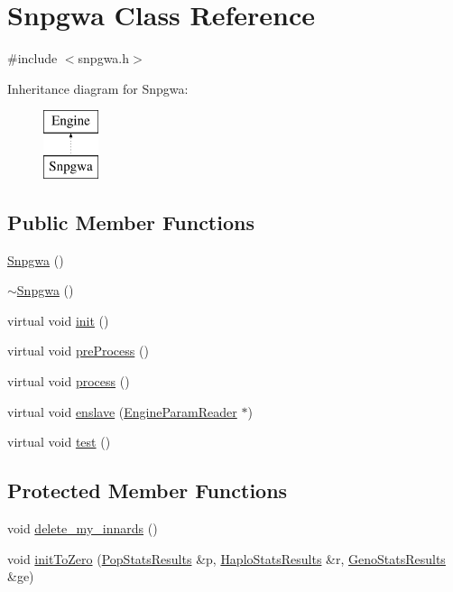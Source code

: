 \hypertarget{classSnpgwa}{
\section{Snpgwa Class Reference}
\label{classSnpgwa}
}


{\ttfamily \#include $<$snpgwa.h$>$}

Inheritance diagram for Snpgwa:\begin{figure}[H]
\begin{center}
\leavevmode
\includegraphics[height=2cm]{classSnpgwa}
\end{center}
\end{figure}
\subsection*{Public Member Functions}
\begin{DoxyCompactItemize}
\item 
\hyperlink{classSnpgwa_af6bc909553a0297002b7863bb8f36b9f}{Snpgwa} ()
\item 
\hyperlink{classSnpgwa_a5c8b9b6f8e59ce1ae40f2a6fe3fbee52}{$\sim$Snpgwa} ()
\item 
virtual void \hyperlink{classSnpgwa_a4d061e98cd1a9b5d9f7d666dea3cd0af}{init} ()
\item 
virtual void \hyperlink{classSnpgwa_aa20dc165d74036ff401ca182f5e980c2}{preProcess} ()
\item 
virtual void \hyperlink{classSnpgwa_a0d01afdbda7f3bb32586962cca76b69a}{process} ()
\item 
virtual void \hyperlink{classSnpgwa_a976e974bf71743c194a9c098cefff04c}{enslave} (\hyperlink{classEngineParamReader}{EngineParamReader} $\ast$)
\item 
virtual void \hyperlink{classSnpgwa_af5ea7279e2d31bc5f05a1fc6cd4ef17e}{test} ()
\end{DoxyCompactItemize}
\subsection*{Protected Member Functions}
\begin{DoxyCompactItemize}
\item 
void \hyperlink{classSnpgwa_ab4eea76f9654a8456bd046213f23d320}{delete\_\-my\_\-innards} ()
\item 
void \hyperlink{classSnpgwa_a5b8b5b406a9ad232ca818dee37d4830d}{initToZero} (\hyperlink{structPopStatsResults}{PopStatsResults} \&p, \hyperlink{structHaploStatsResults}{HaploStatsResults} \&r, \hyperlink{structGenoStatsResults}{GenoStatsResults} \&ge)
\end{DoxyCompactItemize}
